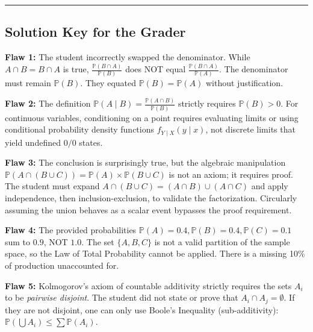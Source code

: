 \documentclass[12pt]{article}
\theoremstyle{definition}
\theoremstyle{remark}
\newcommand{\Pbb}{\mathbb{P}}
\begin{document}
\vspace{1cm}
\hrule
\vspace{0.5cm}

\subsection*{Solution Key for the Grader}

\textbf{Flaw 1:} The student incorrectly swapped the denominator. While $A \cap B = B \cap A$ is true, $\frac{\Pbb(B \cap A)}{\Pbb(B)}$ does NOT equal $\frac{\Pbb(B \cap A)}{\Pbb(A)}$. The denominator must remain $\Pbb(B)$. They equated $\Pbb(B) = \Pbb(A)$ without justification.

\textbf{Flaw 2:} The definition $\Pbb(A \mid B) = \frac{\Pbb(A \cap B)}{\Pbb(B)}$ strictly requires $\Pbb(B) > 0$. For continuous variables, conditioning on a point requires evaluating limits or using conditional probability density functions $f_{Y \mid X}(y \mid x)$, not discrete limits that yield undefined $0/0$ states.

\textbf{Flaw 3:} The conclusion is surprisingly true, but the algebraic manipulation $\Pbb(A \cap (B \cup C)) = \Pbb(A) \times \Pbb(B \cup C)$ is not an axiom; it requires proof. The student must expand $A \cap (B \cup C) = (A \cap B) \cup (A \cap C)$ and apply independence, then inclusion-exclusion, to validate the factorization. Circularly assuming the union behaves as a scalar event bypasses the proof requirement.

\textbf{Flaw 4:} The provided probabilities $\Pbb(A)=0.4, \Pbb(B)=0.4, \Pbb(C)=0.1$ sum to $0.9$, NOT $1.0$. The set $\{A, B, C\}$ is not a valid partition of the sample space, so the Law of Total Probability cannot be applied. There is a missing 10\% of production unaccounted for.

\textbf{Flaw 5:} Kolmogorov's axiom of countable additivity strictly requires the sets $A_i$ to be \textit{pairwise disjoint}. The student did not state or prove that $A_i \cap A_j = \emptyset$. If they are not disjoint, one can only use Boole's Inequality (sub-additivity): $\Pbb(\bigcup A_i) \le \sum \Pbb(A_i)$.
\end{document}
